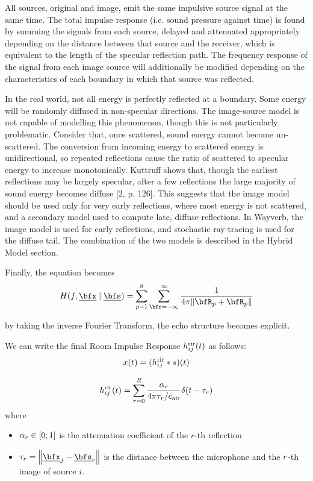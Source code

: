 All sources, original and image, emit the same impulsive source signal at the same time. The total impulse response (i.e. sound pressure against time) is found by summing the signals from each source, delayed and attenuated appropriately depending on the distance between that source and the receiver, which is equivalent to the length of the specular reflection path. The frequency response of the signal from each image source will additionally be modified depending on the characteristics of each boundary in which that source was reflected.

In the real world, not all energy is perfectly reflected at a boundary.
Some energy will be randomly diffused in non-specular directions.
The image-source model is not capable of modelling this phenomenon, though this is not particularly problematic.
Consider that, once scattered, sound energy cannot become un-scattered.
The conversion from incoming energy to scattered energy is unidirectional, so repeated reflections cause the ratio of scattered to specular energy to increase monotonically.
Kuttruff shows that, though the earliest reflections may be largely specular, after a few reflections the large majority of sound energy becomes diffuse [2, p. 126].
This suggests that the image model should be used only for very early reflections, where most energy is not scattered, and a secondary model used to compute late, diffuse reflections.
In Wayverb, the image model is used for early reflections, and stochastic ray-tracing is used for the diffuse tail.
The combination of the two models is described in the Hybrid Model section.


Finally, the equation becomes
\begin{equation}
    \label{eq:acoustics:ims:frourier}
    H(f, \positionMicrophone \mid \positionSource) =
        \sum_{p=1}^{8}
            \sum_{\pos=-\infty}^{\infty}
                \frac{1}{4 \pi \norm{\coordinatePermutation_p +  \coordinatePermutation_p}}
\end{equation}

by taking the inverse Fourier Transform, the echo structure becomes explicit.

We can write the final Room Impulse Response $h^{\text{rir}}_{ij}(t)$ as follows:
\begin{equation}
    x(t) = (h^{\text{rir}}_{ij} \ast s)(t)
\end{equation}

\begin{equation}
    \rir_{ij}(t) = \sum_{r=0}^{R} \frac{\alpha_r}{4 \pi \tau_r / \cair} \delta \kparen{t - \tau_r}
\end{equation}
where
\begin{itemize}
    \item $\alpha_r \in \kintervcc{0}{1}$ is the attenuation coefficient of the $r$-th reflection
    \item $\tau_r = \norm{\positionMicrophone_\idxMic - \positionSource_\idxEch}$ is the distance between the microphone and the $r$-th image of source $i$.
\end{itemize}

